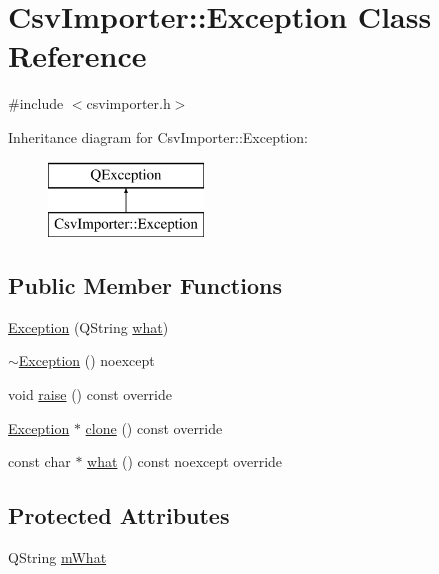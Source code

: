 \hypertarget{class_csv_importer_1_1_exception}{}\section{Csv\+Importer\+::Exception Class Reference}
\label{class_csv_importer_1_1_exception}


{\ttfamily \#include $<$csvimporter.\+h$>$}

Inheritance diagram for Csv\+Importer\+::Exception\+:\begin{figure}[H]
\begin{center}
\leavevmode
\includegraphics[height=2.000000cm]{d1/dec/class_csv_importer_1_1_exception}
\end{center}
\end{figure}
\subsection*{Public Member Functions}
\begin{DoxyCompactItemize}
\item 
\mbox{\hyperlink{class_csv_importer_1_1_exception_a6a57b3ebfe02b0ff266fdc8fc801a8bc}{Exception}} (Q\+String \mbox{\hyperlink{class_csv_importer_1_1_exception_a93fb73b2098d48afc86ae14c3ba32f29}{what}})
\item 
\mbox{\hyperlink{class_csv_importer_1_1_exception_a858348729304c5d8cc9e5387962dd49a}{$\sim$\+Exception}} () noexcept
\item 
void \mbox{\hyperlink{class_csv_importer_1_1_exception_ae323052618ca9f6c29953170f36daac6}{raise}} () const override
\item 
\mbox{\hyperlink{class_csv_importer_1_1_exception}{Exception}} $\ast$ \mbox{\hyperlink{class_csv_importer_1_1_exception_ac560ec50556f90b20bd6d952c49c60b5}{clone}} () const override
\item 
const char $\ast$ \mbox{\hyperlink{class_csv_importer_1_1_exception_a93fb73b2098d48afc86ae14c3ba32f29}{what}} () const noexcept override
\end{DoxyCompactItemize}
\subsection*{Protected Attributes}
\begin{DoxyCompactItemize}
\item 
Q\+String \mbox{\hyperlink{class_csv_importer_1_1_exception_a6c7f91227270dc6aa4435be0750d11b0}{m\+What}}
\end{DoxyCompactItemize}


